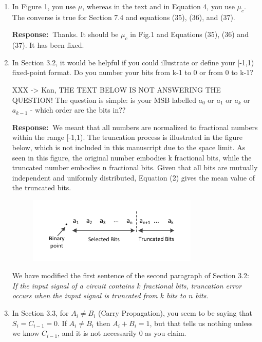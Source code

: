 \documentclass[a4paper, 11pt]{article}
\def\Response{\noindent \textbf{Response:~}}
\newcommand{\Question}[1]{\textcolor[rgb]{0.51,0.00,0.00}{#1}}
\newcommand{\PaperText}[1]{\emph{#1}}
\begin{document}
\begin{enumerate}
  \item \Question{In Figure 1, you use $\mu$, whereas in the text and in Equation 4, you use $\mu_c$.  The converse is true for Section 7.4 and equations (35), (36), and (37).}
      
      \Response Thanks. It should be $\mu_c$ in Fig.1 and Equations (35), (36) and (37). It has been fixed.\\
      
  \item \Question{In Section 3.2, it would be helpful if you could illustrate or define your [-1,1) fixed-point format. Do you number your bits from k-1 to 0 or from 0 to k-1?}
      
      
 XXX -> Kan, THE TEXT BELOW IS NOT ANSWERING THE QUESTION! The question is simple: is your MSB labelled $a_0$ or $a_1$ or $a_k$ or $a_{k-1}$ - which order are the bits in??
      
      \Response We meant that all numbers are normalized to fractional numbers within the range [-1,1). The truncation process is illustrated in the figure below, which is not included in this manuscript due to the space limit. As seen in this figure, the original number embodies k fractional bits, while the truncated number embodies n fractional bits. Given that all bits are mutually independent and uniformly distributed, Equation (2) gives the mean value of the truncated bits. 
      
      \begin{figure}[htbp]
        \centering
        \includegraphics[width=3.2in]{./Figure/Truncation.pdf}
      \end{figure}
      
      We have modified the first sentence of the second paragraph of Section 3.2:\\
      
      \PaperText{If the input signal of a circuit contains $k$ fractional bits, truncation error occurs when the input signal is truncated from $k$ bits to $n$ bits.}\\
      
  \item \Question{In Section 3.3, for $A_i\neq B_i$ (Carry Propagation), you seem to be saying that $S_i = C_{i-1} = 0$.  If $A_i \neq B_i$ then $A_i + B_i = 1$, but that tells us nothing unless we know $C_{i-1}$, and it is not necessarily 0 as you claim.}
      

\end{enumerate}
\end{document}
